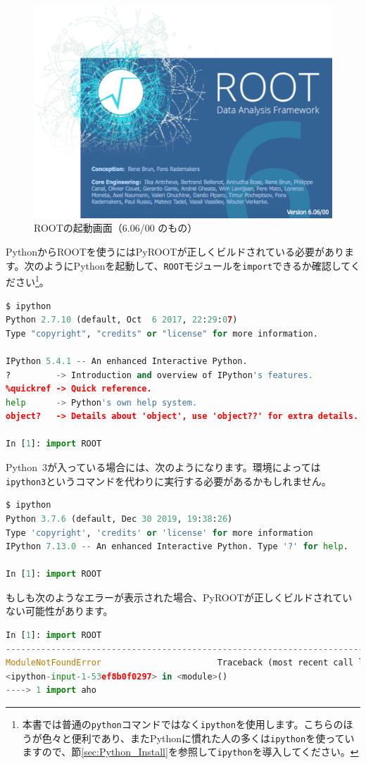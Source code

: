 {\begin{figure}
  \centering
  \includegraphics[width=12cm]{fig/splash6.png}
  \caption{ROOTの起動画面（6.06/00 のもの）}
  \label{fig:splash}
\end{figure}

PythonからROOTを使うにはPyROOTが正しくビルドされている必要があります。次のようにPythonを起動して、\texttt{ROOT}モジュールを\texttt{import}できるか確認してください\footnote{本書では普通の\texttt{python}コマンドではなく\texttt{ipython}を使用します。こちらのほうが色々と便利であり、またPythonに慣れた人の多くは\texttt{ipython}を使っていますので、節\ref{sec:Python_Install}を参照して\texttt{ipython}を導入してください。}。
\begin{lstlisting}[language=python]
$ ipython
Python 2.7.10 (default, Oct  6 2017, 22:29:07) 
Type "copyright", "credits" or "license" for more information.

IPython 5.4.1 -- An enhanced Interactive Python.
?         -> Introduction and overview of IPython's features.
%quickref -> Quick reference.
help      -> Python's own help system.
object?   -> Details about 'object', use 'object??' for extra details.

In [1]: import ROOT
\end{lstlisting}

Python~3が入っている場合には、次のようになります。環境によっては\texttt{ipython3}というコマンドを代わりに実行する必要があるかもしれません。
\begin{lstlisting}[language=python]
$ ipython
Python 3.7.6 (default, Dec 30 2019, 19:38:26) 
Type 'copyright', 'credits' or 'license' for more information
IPython 7.13.0 -- An enhanced Interactive Python. Type '?' for help.

In [1]: import ROOT           
\end{lstlisting}
もしも次のようなエラーが表示された場合、PyROOTが正しくビルドされていない可能性があります。
\begin{lstlisting}[language=python]
In [1]: import ROOT
---------------------------------------------------------------------------
ModuleNotFoundError                       Traceback (most recent call last)
<ipython-input-1-53ef8b0f0297> in <module>()
----> 1 import aho


\end{lstlisting}}
